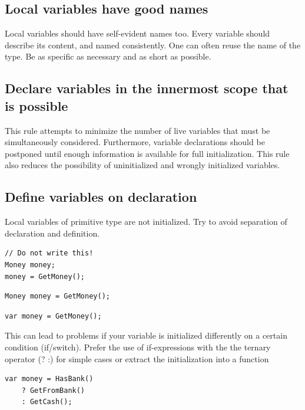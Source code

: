 \documentclass[11pt,a4paper]{article}
\begin{document}
\subsection{Local variables have good names}

Local variables should have self-evident names too. Every variable should describe its content, and named consistently. One can often reuse the name of the type. Be as specific as necessary and as short as possible.

\subsection{Declare variables in the innermost scope that is possible}

This rule attempts to minimize the number of live variables that must be simultaneously considered. Furthermore, variable declarations should be postponed until enough information is available for full initialization. This rule also reduces the possibility of uninitialized and wrongly initialized variables.

\subsection{Define variables on declaration}

Local variables of primitive type are not initialized. Try to avoid separation of declaration and definition.

\begin{lstlisting}[language={[Sharp]C}, caption={Bad example}]
// Do not write this!
Money money;
money = GetMoney();
\end{lstlisting}

\begin{lstlisting}[language={[Sharp]C}, caption={Better example}]
Money money = GetMoney();
\end{lstlisting}

\begin{lstlisting}[language={[Sharp]C}, caption={Even better example}]
var money = GetMoney();
\end{lstlisting}

This can lead to problems if your variable is initialized differently on a certain condition (if/switch). Prefer the use of if-expressions with the the ternary operator (? :) for simple cases or extract the initialization into a function

\begin{lstlisting}[language={[Sharp]C}, caption={This could also be easily refactored into a function}]
var money = HasBank() 
    ? GetFromBank() 
    : GetCash();
\end{lstlisting}
\end{document}
